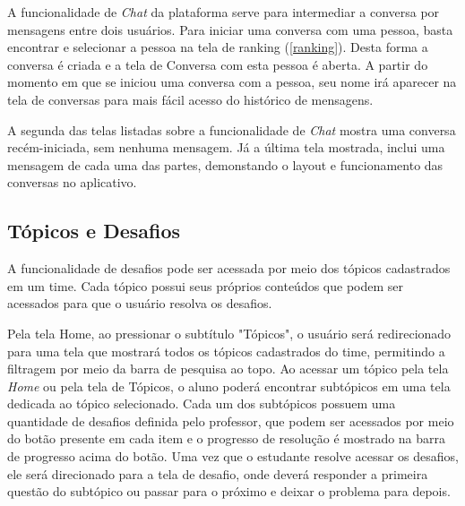 A funcionalidade de \textit{Chat} da plataforma serve para intermediar a conversa por mensagens entre dois usuários. Para iniciar uma conversa com uma pessoa, basta encontrar e selecionar a pessoa na tela de ranking (\ref{ranking}). Desta forma a conversa é criada e a tela de Conversa com esta pessoa é aberta. A partir do momento em que se iniciou uma conversa com a pessoa, seu nome irá aparecer na tela de conversas para mais fácil acesso do histórico de mensagens.


A segunda das telas listadas sobre a funcionalidade de \textit{Chat} mostra uma conversa recém-iniciada, sem nenhuma mensagem. Já a última tela mostrada, inclui uma mensagem de cada uma das partes, demonstando o layout e funcionamento das conversas no aplicativo.

\subsection{Tópicos e Desafios}
\label{topics_challenges}

A funcionalidade de desafios pode ser acessada por meio dos tópicos cadastrados em um time. Cada tópico possui seus próprios conteúdos que podem ser acessados para que o usuário resolva os desafios.


Pela tela Home, ao pressionar o subtítulo "Tópicos", o usuário será redirecionado para uma tela que mostrará todos os tópicos cadastrados do time, permitindo a filtragem por meio da barra de pesquisa ao topo. Ao acessar um tópico pela tela \textit{Home} ou pela tela de Tópicos, o aluno poderá encontrar subtópicos em uma tela dedicada ao tópico selecionado. Cada um dos subtópicos possuem uma quantidade de desafios definida pelo professor, que podem ser acessados por meio do botão presente em cada item e o progresso de resolução é mostrado na barra de progresso acima do botão. Uma vez que o estudante resolve acessar os desafios, ele será direcionado para a tela de desafio, onde deverá responder a primeira questão do subtópico ou passar para o próximo e deixar o problema para depois.


